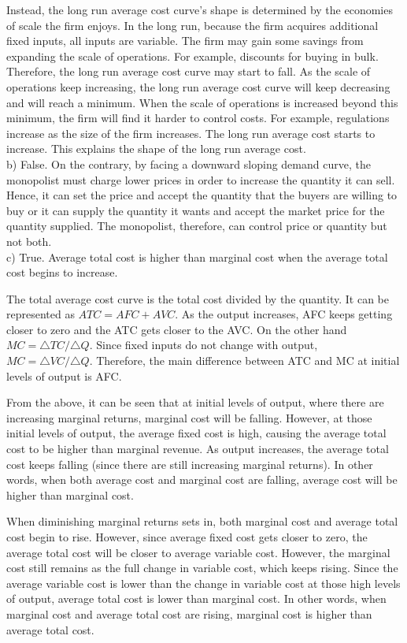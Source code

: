 \documentclass[12pt]{article}
\begin{document}
Instead, the long run average cost curve's shape is determined by the economies of scale the firm enjoys. In the long run, because the firm acquires additional fixed inputs, all inputs are variable. The firm may gain some savings from expanding the scale of operations. For example, discounts for buying in bulk. Therefore, the long run average cost curve may start to fall. As the scale of operations keep increasing, the long run average cost curve will keep decreasing and will reach a minimum. When the scale of operations is increased beyond this minimum, the firm will find it harder to control costs. For example, regulations increase as the size of the firm increases. The long run average cost starts to increase. This explains the shape of the long run average cost.\\

b) False. On the contrary, by facing a downward sloping demand curve, the monopolist must charge lower prices in order to increase the quantity it can sell. Hence, it can set the price and accept the quantity that the buyers are willing to buy or it can supply the quantity it wants and accept the market price for the quantity supplied. The monopolist, therefore, can control price or quantity but not both.\\

c) True. Average total cost is higher than marginal cost when the average total cost begins to increase.

  The total average cost curve is the total cost divided by the quantity. It can be represented as $ATC = AFC + AVC$. As the output increases, AFC keeps getting closer to zero and the ATC gets closer to the AVC. On the other hand $ MC = \triangle TC / \triangle Q $. Since fixed inputs do not change with output, $ MC = \triangle VC / \triangle Q $. Therefore, the main difference between ATC and MC at initial levels of output is AFC. 
 
  From the above, it can be seen that at initial levels of output, where there are increasing marginal returns, marginal cost will be falling. However, at those initial levels of output, the average fixed cost is high, causing the average total cost to be higher than marginal revenue. As output increases, the average total cost keeps falling (since there are still increasing marginal returns). In other words, when both average cost and marginal cost are falling, average cost will be higher than marginal cost.
  
  When diminishing marginal returns sets in, both marginal cost and average total cost begin to rise. However, since average fixed cost gets closer to zero, the average total cost will be closer to average variable cost. However, the marginal cost still remains as the full change in variable cost, which keeps rising. Since the average variable cost is lower than the change in variable cost at those high levels of output, average total cost is lower than marginal cost. In other words, when marginal cost and average total cost are rising, marginal cost is higher than average total cost.\\
  
\end{document}

